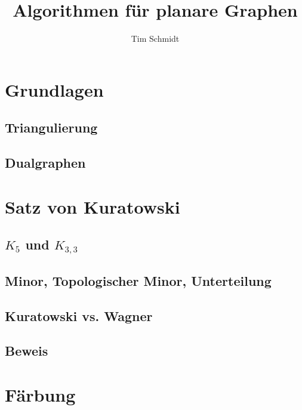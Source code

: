 \documentclass[10pt,a4paper]{article}
\author{Tim Schmidt}
\title{Algorithmen für planare Graphen}
\begin{document}
	{\let\newpage\relax\maketitle}
	\tableofcontents
	\newpage
	\setcounter{page}{1}


\section{Grundlagen}
\subsection{Triangulierung}
\subsection{Dualgraphen}


\section{Satz von Kuratowski}
\subsection{$K_5$ und $K_{3,3}$}
\subsection{Minor, Topologischer Minor, Unterteilung}
\subsection{Kuratowski vs. Wagner}
\subsection{Beweis}


\section{Färbung}
\end{document}
